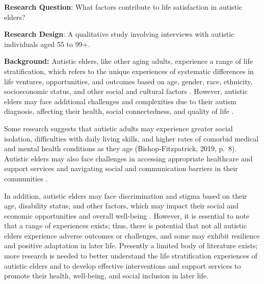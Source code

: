 \documentclass[
  11pt,
]{book}
\begin{document}
\textbf{Research Question}: What factors contribute to life satisfaction in autistic elders?

\textbf{Research Design}: A qualitative study involving interviews with autistic individuals aged 55 to 99+.

\textbf{Background:} Autistic elders, like other aging adults, experience a range of life stratification, which refers to the unique experiences of systematic differences in life ventures, opportunities, and outcomes based on age, gender, race, ethnicity, socioeconomic status, and other social and cultural factors \citep{bishop-fitzpatrick_autism_2019, gothelf_intersection_2019, munnell_aging_2017}. However, autistic elders may face additional challenges and complexities due to their autism diagnosis, affecting their health, social connectedness, and quality of life \citep[p.~8]{bishop-fitzpatrick_autism_2019}.

Some research suggests that autistic adults may experience greater social isolation, difficulties with daily living skills, and higher rates of comorbid medical and mental health conditions as they age (Bishop-Fitzpatrick, 2019, p.~8). Autistic elders may also face challenges in accessing appropriate healthcare and support services and navigating social and communication barriers in their communities \citep{munnell_aging_2017}.

In addition, autistic elders may face discrimination and stigma based on their age, disability status, and other factors, which may impact their social and economic opportunities and overall well-being \citep{munnell_aging_2017}. However, it is essential to note that a range of experiences exists; thus, there is potential that not all autistic elders experience adverse outcomes or challenges, and some may exhibit resilience and positive adaptation in later life. Presently a limited body of literature exists; more research is needed to better understand the life stratification experiences of autistic elders and to develop effective interventions and support services to promote their health, well-being, and social inclusion in later life.
\end{document}
